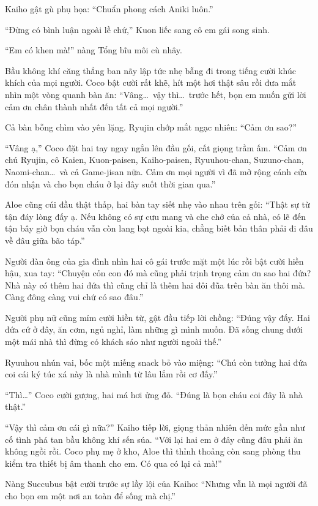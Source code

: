 ﻿\documentclass[../main.tex]{subfiles}
\begin{document}
Kaiho gật gù phụ họa: ``Chuẩn phong cách Aniki luôn.''

``Đừng có bình luận ngoài lề chứ,'' Kuon liếc sang cô em gái song sinh.

``Em có khen mà!'' nàng Tổng bĩu môi cù nhây.

Bầu không khí căng thẳng ban nãy lập tức nhẹ bẫng đi trong tiếng cười khúc khích của mọi người. Coco bật cười rất khẽ, hít một hơi thật sâu rồi đưa mắt nhìn một vòng quanh bàn ăn: ``Vâng\dots\ vậy thì\dots\ trước hết, bọn em muốn gửi lời cảm ơn chân thành nhất đến tất cả mọi người.''

Cả bàn bỗng chìm vào yên lặng. Ryujin chớp mắt ngạc nhiên: ``Cảm ơn sao?''

``Vâng ạ,'' Coco đặt hai tay ngay ngắn lên đầu gối, cất giọng trầm ấm. ``Cảm ơn chú Ryujin, cô Kaien, Kuon-paisen, Kaiho-paisen, Ryuuhou-chan, Suzuno-chan, Naomi-chan\dots\ và cả Game-jisan nữa. Cảm ơn mọi người vì đã mở rộng cánh cửa đón nhận và cho bọn cháu ở lại đây suốt thời gian qua.''

Aloe cũng cúi đầu thật thấp, hai bàn tay siết nhẹ vào nhau trên gối: ``Thật sự từ tận đáy lòng đấy ạ. Nếu không có sự cưu mang và che chở của cả nhà, có lẽ đến tận bây giờ bọn cháu vẫn còn lang bạt ngoài kia, chẳng biết bản thân phải đi đâu về đâu giữa bão táp.''

Người đàn ông của gia đình nhìn hai cô gái trước mặt một lúc rồi bật cười hiền hậu, xua tay: ``Chuyện cỏn con đó mà cũng phải trịnh trọng cảm ơn sao hai đứa? Nhà này có thêm hai đứa thì cũng chỉ là thêm hai đôi đũa trên bàn ăn thôi mà. Càng đông càng vui chứ có sao đâu.''

Người phụ nữ cũng mỉm cười hiền từ, gật đầu tiếp lời chồng: ``Đúng vậy đấy. Hai đứa cứ ở đây, ăn cơm, ngủ nghỉ, làm những gì mình muốn. Đã sống chung dưới một mái nhà thì đừng có khách sáo như người ngoài thế.''

Ryuuhou nhún vai, bốc một miếng snack bỏ vào miệng: ``Chú còn tưởng hai đứa coi cái ký túc xá này là nhà mình từ lâu lắm rồi cơ đấy.''

``Thì\dots'' Coco cười gượng, hai má hơi ửng đỏ. ``Đúng là bọn cháu coi đây là nhà thật.''

``Vậy thì cảm ơn cái gì nữa?'' Kaiho tiếp lời, giọng thản nhiên đến mức gần như cố tình phá tan bầu không khí sến súa. ``Với lại hai em ở đây cũng đâu phải ăn không ngồi rồi. Coco phụ mẹ ở kho, Aloe thì thỉnh thoảng còn sang phòng thu kiểm tra thiết bị âm thanh cho em. Có qua có lại cả mà!''

Nàng Succubus bật cười trước sự lầy lội của Kaiho: ``Nhưng vẫn là mọi người đã cho bọn em một nơi an toàn để sống mà chị.''
\end{document}
